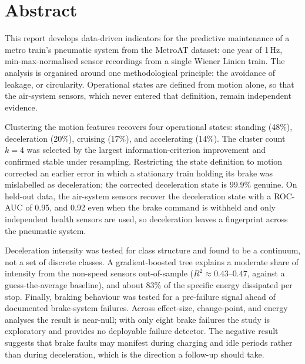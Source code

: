 \chapter*{Abstract}

This report develops data-driven indicators for the predictive maintenance of a metro
train's pneumatic system from the MetroAT dataset: one year of 1\,Hz, min-max-normalised
sensor recordings from a single Wiener Linien train. The analysis is organised around one
methodological principle: the avoidance of leakage, or circularity. Operational states
are defined from motion alone, so that the air-system sensors, which never entered that
definition, remain independent evidence.

Clustering the motion features recovers four operational states: standing (48\%),
deceleration (20\%), cruising (17\%), and accelerating (14\%). The cluster count $k=4$ was
selected by the largest information-criterion improvement and confirmed stable under
resampling. Restricting the state definition to motion corrected an earlier error in which
a stationary train holding its brake was mislabelled as deceleration; the corrected
deceleration state is 99.9\% genuine. On held-out data, the air-system sensors recover the
deceleration state with a ROC-AUC of 0.95, and 0.92 even when the brake command is withheld
and only independent health sensors are used, so deceleration leaves a fingerprint across
the pneumatic system.

Deceleration intensity was tested for class structure and found to be a continuum, not a
set of discrete classes. A gradient-boosted tree explains a moderate share of intensity
from the non-speed sensors out-of-sample ($R^2 \approx 0.43$--$0.47$, against a
guess-the-average baseline), and about 83\% of the specific energy dissipated per stop.
Finally, braking behaviour was tested for a pre-failure signal ahead of documented
brake-system failures. Across effect-size, change-point, and energy analyses the result is
near-null; with only eight brake failures the study is exploratory and provides no
deployable failure detector. The negative result suggests that brake faults may manifest
during charging and idle periods rather than during deceleration, which is the direction a
follow-up should take.
